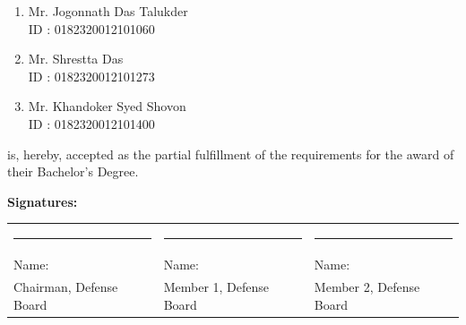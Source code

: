 \documentclass[12pt, a4paper, twoside, openany]{report}
\begin{document}
\begin{enumerate}[label=\arabic*.]
    \item Mr. Jogonnath Das Talukder\\
          ID : 0182320012101060
    \item Mr. Shrestta Das\\
          ID : 0182320012101273
    \item Mr. Khandoker Syed Shovon\\
          ID : 0182320012101400
\end{enumerate}

is, hereby, accepted as the partial fulfillment of the requirements for the award of their Bachelor's Degree.
\vspace{3cm}

\noindent\textbf{Signatures:}\\[2cm]
\noindent
\begin{tabularx}{\textwidth}{@{}XXX@{}}
    \rule{4.5cm}{0.4pt} & \rule{4.5cm}{0.4pt} & \rule{4.5cm}{0.4pt} \\
    Name: & Name: & Name: \\[0.5cm]
    Chairman, Defense Board & Member 1, Defense Board & Member 2, Defense Board
\end{tabularx}
\end{document}

